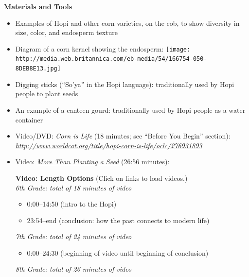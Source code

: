 \documentclass[12pt,]{article}
\providecommand{\tightlist}{%
  \setlength{\itemsep}{0pt}\setlength{\parskip}{0pt}}
\begin{document}
\textbf{Materials and Tools}

\begin{itemize}
\item
  Examples of Hopi and other corn varieties, on the cob, to show
  diversity in size, color, and endosperm texture
\item
  Diagram of a corn kernel showing the endosperm:
  \texttt{[image: http://media.web.britannica.com/eb-media/54/166754-050-8DEB8E13.jpg]}
\item
  Digging sticks (``So'ya'' in the Hopi language): traditionally used by
  Hopi people to plant seeds
\item
  An example of a canteen gourd: traditionally used by Hopi people as
  a water container
\item
  Video/DVD: \emph{Corn is Life} (18 minutes; see ``Before You Begin''
  section):
  \href{http://www.worldcat.org/title/hopi-corn-is-life/oclc/276931893}{\emph{http://www.worldcat.org/title/hopi-corn-is-life/oclc/276931893}}
\item
  Video: \href{https://www.youtube.com/watch?v=2x23FF_kUyo}{\emph{More Than Planting a Seed}} (26:56 minutes):

  \textbf{Video: Length Options} (Click on links to load videos.)\\
  \emph{6th Grade: total of 18 minutes of video}

  \begin{itemize}
  \tightlist
  \item
    0:00--14:50 (intro to the Hopi)
  \item
    23:54--end (conclusion: how the past connects to modern life)
  \end{itemize}

  \emph{7th Grade: total of 24 minutes of video}

  \begin{itemize}
  \tightlist
  \item
    0:00--24:30 (beginning of video until beginning of conclusion)
  \end{itemize}

  \emph{8th Grade: total of 26 minutes of video}


\end{itemize}
\end{document}

